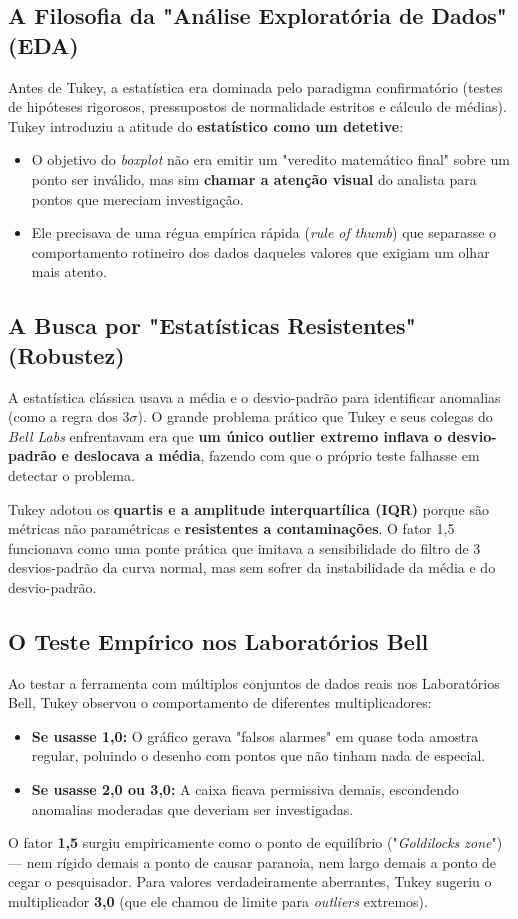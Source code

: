 \documentclass[12pt,a4paper]{article}
\begin{document}
\subsection{A Filosofia da "Análise Exploratória de Dados" (EDA)}
Antes de Tukey, a estatística era dominada pelo paradigma confirmatório (testes de hipóteses rigorosos, pressupostos de normalidade estritos e cálculo de médias). Tukey introduziu a atitude do \textbf{estatístico como um detetive}:
\begin{itemize}
    \item O objetivo do \textit{boxplot} não era emitir um "veredito matemático final" sobre um ponto ser inválido, mas sim \textbf{chamar a atenção visual} do analista para pontos que mereciam investigação.
    \item Ele precisava de uma régua empírica rápida (\textit{rule of thumb}) que separasse o comportamento rotineiro dos dados daqueles valores que exigiam um olhar mais atento.
\end{itemize}

\subsection{A Busca por "Estatísticas Resistentes" (Robustez)}
A estatística clássica usava a média e o desvio-padrão para identificar anomalias (como a regra dos $3\sigma$). O grande problema prático que Tukey e seus colegas do \textit{Bell Labs} enfrentavam era que \textbf{um único outlier extremo inflava o desvio-padrão e deslocava a média}, fazendo com que o próprio teste falhasse em detectar o problema.

Tukey adotou os \textbf{quartis e a amplitude interquartílica (IQR)} porque são métricas não paramétricas e \textbf{resistentes a contaminações}. O fator 1,5 funcionava como uma ponte prática que imitava a sensibilidade do filtro de 3 desvios-padrão da curva normal, mas sem sofrer da instabilidade da média e do desvio-padrão.

\subsection{O Teste Empírico nos Laboratórios Bell}
Ao testar a ferramenta com múltiplos conjuntos de dados reais nos Laboratórios Bell, Tukey observou o comportamento de diferentes multiplicadores:
\begin{itemize}
    \item \textbf{Se usasse 1,0:} O gráfico gerava "falsos alarmes" em quase toda amostra regular, poluindo o desenho com pontos que não tinham nada de especial.
    \item \textbf{Se usasse 2,0 ou 3,0:} A caixa ficava permissiva demais, escondendo anomalias moderadas que deveriam ser investigadas.
\end{itemize}
O fator \textbf{1,5} surgiu empiricamente como o ponto de equilíbrio ("\textit{Goldilocks zone}") — nem rígido demais a ponto de causar paranoia, nem largo demais a ponto de cegar o pesquisador. Para valores verdadeiramente aberrantes, Tukey sugeriu o multiplicador \textbf{3,0} (que ele chamou de limite para \textit{outliers} extremos).
\end{document}
